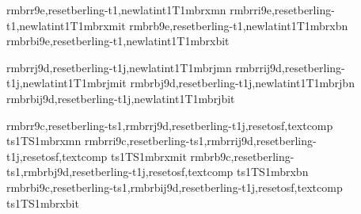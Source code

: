 



\installfonts


    {rmbrr9e,resetberling-t1,newlatin}{t1}{T1}{mbrx}{m}{n}{}
    {rmbrri9e,resetberling-t1,newlatin}{t1}{T1}{mbrx}{m}{it}{}
    {rmbrb9e,resetberling-t1,newlatin}{t1}{T1}{mbrx}{b}{n}{}
    {rmbrbi9e,resetberling-t1,newlatin}{t1}{T1}{mbrx}{b}{it}{}




    {rmbrrj9d,resetberling-t1j,newlatin}{t1}{T1}{mbrj}{m}{n}{}
    {rmbrrij9d,resetberling-t1j,newlatin}{t1}{T1}{mbrj}{m}{it}{}
    {rmbrbj9d,resetberling-t1j,newlatin}{t1}{T1}{mbrj}{b}{n}{}
    {rmbrbij9d,resetberling-t1j,newlatin}{t1}{T1}{mbrj}{b}{it}{}




    {rmbrr9c,resetberling-ts1,rmbrrj9d,resetberling-t1j,resetosf,textcomp}
	{ts1}{TS1}{mbrx}{m}{n}{}
	{rmbrri9c,resetberling-ts1,rmbrrij9d,resetberling-t1j,resetosf,textcomp}
	{ts1}{TS1}{mbrx}{m}{it}{}
    {rmbrb9c,resetberling-ts1,rmbrbj9d,resetberling-t1j,resetosf,textcomp}
	{ts1}{TS1}{mbrx}{b}{n}{}
	{rmbrbi9c,resetberling-ts1,rmbrbij9d,resetberling-t1j,resetosf,textcomp}
	{ts1}{TS1}{mbrx}{b}{it}{}







\endinstallfonts

\bye
